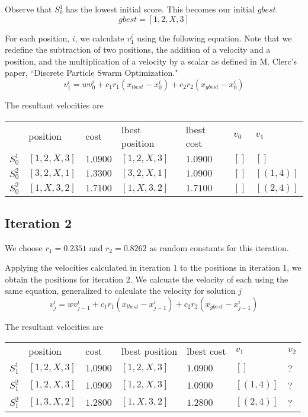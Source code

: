 \documentclass[a4paper]{article}
\begin{document}
Observe that $S_0^1$ has the lowest initial score. This becomes our initial $\mathit{gbest}$.
$$\mathit{gbest} = [1, 2, X, 3]$$

For each position, $i$, we calculate $v_1^i$ using the following equation. Note that we redefine the subtraction of two positions, the addition of a velocity and a position, and the multiplication of a velocity by a scalar as defined in M. Clerc's paper, ``Discrete Particle Swarm Optimization."
$$v_1^i = w v_0^i + c_1 r_1 (x_\mathit{lbest} - x_0^i) + c_2 r_2 (x_\mathit{gbest} - x_0^i)$$

The resultant velocities are \mbox{}
\begin{center}
\begin{tabular}{lllllll}
        & position     & cost   & lbest position & lbest cost & $v_0$  & $v_1$    \\
$S_0^1$ & $[1, 2, X, 3]$ & $1.0900$ & $[1, 2, X, 3]$   & $1.0900$     & $[]$     & $[]      $ \\
$S_0^2$ & $[3, 2, X, 1]$ & $1.3300$ & $[3, 2, X, 1]$   & $1.0900$     & $[]$     & $[(1, 4)]$ \\
$S_0^2$ & $[1, X, 3, 2]$ & $1.7100$ & $[1, X, 3, 2]$   & $1.7100$     & $[]$     & $[(2, 4)]$ \\
\end{tabular}
\end{center}

\subsection{Iteration 2}

We choose $r_1 = 0.2351$ and $r_2 = 0.8262$ as random constants for this iteration.

Applying the velocities calculated in iteration 1 to the positions in iteration 1, we obtain the positions for iteration 2. We calcuate the velocity of each using the same equation, generalized to calculate the velocity for solution $j$
$$v_j^i = w v_{j-1}^i + c_1 r_1 (x_\mathit{lbest} - x_{j-1}^i) + c_2 r_2 (x_\mathit{gbest} - x_{j-1}^i)$$

The resultant velocities are \mbox{}
\begin{center}
\begin{tabular}{lllllll}
        & position       & cost     & lbest position   & lbest cost   & $v_1$      & $v_2$    \\
$S_1^1$ & $[1, 2, X, 3]$ & $1.0900$ & $[1, 2, X, 3]$   & $1.0900$     & $[]      $ & ? \\
$S_1^2$ & $[1, 2, X, 3]$ & $1.0900$ & $[1, 2, X, 3]$   & $1.0900$     & $[(1, 4)]$ & ? \\
$S_1^2$ & $[1, 3, X, 2]$ & $1.2800$ & $[1, X, 3, 2]$   & $1.2800$     & $[(2, 4)]$ & ? \\
\end{tabular}
\end{center}
\end{document}
